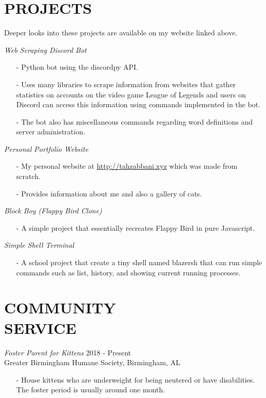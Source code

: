 \documentclass[margin, 10pt]{res} %
\begin{document}
\begin{resume}
\section{PROJECTS}

Deeper looks into these projects are available on my website linked above.

{\sl Web Scraping Discord Bot}
\begin{itemize} \itemsep -2pt %
\item[-] Python bot using the discordpy API.
\item[-] Uses many libraries to scrape information from websites that gather statistics on accounts on the video game League of Legends and users on Discord can access this information using commands implemented in the bot.
\item[-] The bot also has miscellaneous commands regarding word definitions and server administration.
\end{itemize}

{\sl Personal Portfolio Website}
\begin{itemize} \itemsep -2pt %
\item[-] My personal website at \url{http://tahzabbani.xyz} which was made from scratch.
\item[-] Provides information about me and also a gallery of cats.
\end{itemize}

{\sl Block Boy (Flappy Bird Clone)}
\begin{itemize} \itemsep -2pt %
\item[-] A simple project that essentially recreates Flappy Bird in pure Javascript.
\end{itemize}

{\sl Simple Shell Terminal}
\begin{itemize} \itemsep -2pt %
\item[-] A school project that create a tiny shell named blazersh that can run simple commands such as list, history, and showing current running processes.
\end{itemize}

\section{COMMUNITY \\ SERVICE}

{\sl Foster Parent for Kittens} \hfill 2018 - Present \\
Greater Birmingham Humane Society, Birmingham, AL
\begin{itemize} 
\item[-] House kittens who are underweight for being neutered or have disabilities. The foster period is usually around one month.
\end{itemize}



\end{resume}
\end{document}

